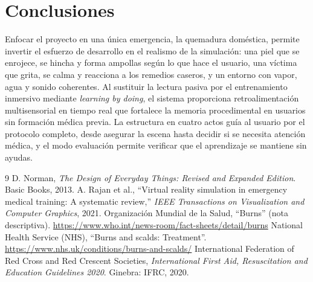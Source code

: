 \documentclass[11pt,letterpaper]{article}
\begin{document}
\section{Conclusiones}

Enfocar el proyecto en una única emergencia, la quemadura doméstica, permite invertir el esfuerzo de desarrollo en el realismo de la simulación: una piel que se enrojece, se hincha y forma ampollas según lo que hace el usuario, una víctima que grita, se calma y reacciona a los remedios caseros, y un entorno con vapor, agua y sonido coherentes. Al sustituir la lectura pasiva por el entrenamiento inmersivo mediante \textit{learning by doing}, el sistema proporciona retroalimentación multisensorial en tiempo real que fortalece la memoria procedimental en usuarios sin formación médica previa. La estructura en cuatro actos guía al usuario por el protocolo completo, desde asegurar la escena hasta decidir si se necesita atención médica, y el modo evaluación permite verificar que el aprendizaje se mantiene sin ayudas.

\begin{thebibliography}{9}
 D. Norman, \textit{The Design of Everyday Things: Revised and Expanded Edition}. Basic Books, 2013.
 A. Rajan et al., ``Virtual reality simulation in emergency medical training: A systematic review,'' \textit{IEEE Transactions on Visualization and Computer Graphics}, 2021.
 Organización Mundial de la Salud, ``Burns'' (nota descriptiva). \url{https://www.who.int/news-room/fact-sheets/detail/burns}
 National Health Service (NHS), ``Burns and scalds: Treatment''. \url{https://www.nhs.uk/conditions/burns-and-scalds/}
 International Federation of Red Cross and Red Crescent Societies, \textit{International First Aid, Resuscitation and Education Guidelines 2020}. Ginebra: IFRC, 2020.
\end{thebibliography}
\end{document}
